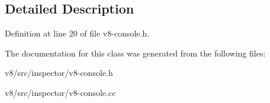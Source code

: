 \subsection{Detailed Description}


Definition at line 20 of file v8-\/console.\+h.



The documentation for this class was generated from the following files\+:\begin{DoxyCompactItemize}
\item 
v8/src/inspector/v8-\/console.\+h\item 
v8/src/inspector/v8-\/console.\+cc\end{DoxyCompactItemize}
